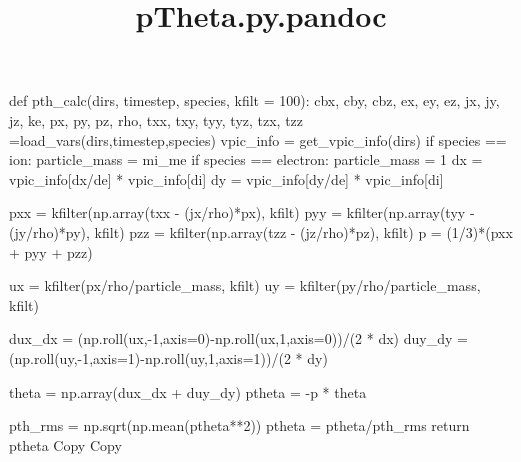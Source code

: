 \documentclass[
]{article}
\title{pTheta.py.pandoc}
\author{}
\date{}
\newenvironment{Shaded}{}{}
\newcommand{\NormalTok}[1]{#1}
\begin{document}
\maketitle

\begin{Shaded}
\begin{Highlighting}[]
\NormalTok{def pth\_calc(dirs, timestep, species, kfilt = 100):}
\NormalTok{    cbx, cby, cbz, ex, ey, ez, jx, jy, jz, ke, px, py, pz, rho, txx, txy, tyy, tyz, tzx, tzz =load\_vars(dirs,timestep,species)}
\NormalTok{    vpic\_info = get\_vpic\_info(dirs)}
\NormalTok{    if species == \textquotesingle{}ion\textquotesingle{}:}
\NormalTok{        particle\_mass = mi\_me}
\NormalTok{    if species == \textquotesingle{}electron\textquotesingle{}:}
\NormalTok{        particle\_mass = 1}
\NormalTok{    dx = vpic\_info[\textquotesingle{}dx/de\textquotesingle{}] * vpic\_info[\textquotesingle{}di\textquotesingle{}]}
\NormalTok{    dy = vpic\_info[\textquotesingle{}dy/de\textquotesingle{}] * vpic\_info[\textquotesingle{}di\textquotesingle{}]}
    
\NormalTok{    pxx = kfilter(np.array(txx {-} (jx/rho)*px), kfilt)}
\NormalTok{    pyy = kfilter(np.array(tyy {-} (jy/rho)*py), kfilt)}
\NormalTok{    pzz = kfilter(np.array(tzz {-} (jz/rho)*pz), kfilt)}
\NormalTok{    p = (1/3)*(pxx + pyy + pzz)}
    
\NormalTok{    ux = kfilter(px/rho/particle\_mass, kfilt)}
\NormalTok{    uy = kfilter(py/rho/particle\_mass, kfilt)}

    
\NormalTok{    dux\_dx = (np.roll(ux,{-}1,axis=0){-}np.roll(ux,1,axis=0))/(2 * dx)}
\NormalTok{    duy\_dy = (np.roll(uy,{-}1,axis=1){-}np.roll(uy,1,axis=1))/(2 * dy)}
    
\NormalTok{    theta = np.array(dux\_dx + duy\_dy)}
\NormalTok{    ptheta = {-}p * theta}

\NormalTok{    pth\_rms = np.sqrt(np.mean(ptheta**2))}
\NormalTok{    ptheta = ptheta/pth\_rms}
\NormalTok{    return ptheta}
\NormalTok{Copy}
\NormalTok{Copy}
\end{Highlighting}
\end{Shaded}
\end{document}
